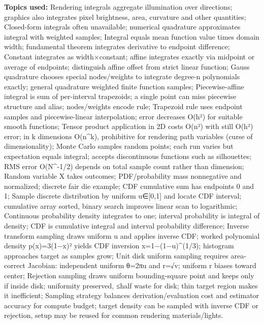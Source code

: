 \textbf{Topics used:} Rendering integrals aggregate illumination over directions; graphics also integrates pixel brightness, area, curvature and other quantities; Closed-form integrals often unavailable; numerical quadrature approximates integral with weighted samples; Integral equals mean function value times domain width; fundamental theorem integrates derivative to endpoint difference; Constant integrates as width×constant; affine integrates exactly via midpoint or average of endpoints; distinguish affine offset from strict linear function; Gauss quadrature chooses special nodes/weights to integrate degree-n polynomials exactly; general quadrature weighted finite function samples; Piecewise-affine integral is sum of per-interval trapezoids; a single point can miss piecewise structure and alias; nodes/weights encode rule; Trapezoid rule uses endpoint samples and piecewise-linear interpolation; error decreases O(h²) for suitable smooth functions; Tensor product application in 2D costs O(n²) with still O(h²) error; in k dimensions O(n\^{}k), prohibitive for rendering path variables (curse of dimensionality); Monte Carlo samples random points; each run varies but expectation equals integral; accepts discontinuous functions such as silhouettes; RMS error O(N\^{}-1/2) depends on total sample count rather than dimension; Random variable X takes outcomes; PDF/probability mass nonnegative and normalized; discrete fair die example; CDF cumulative sum has endpoints 0 and 1; Sample discrete distribution by uniform u∈{[}0,1{]} and locate CDF interval; cumulative array sorted, binary search improves linear scan to logarithmic; Continuous probability density integrates to one; interval probability is integral of density; CDF is cumulative integral and interval probability difference; Inverse transform sampling draws uniform u and applies inverse CDF; worked polynomial density p(x)=3(1−x)² yields CDF inversion x=1−(1−u)\^{}(1/3); histogram approaches target as samples grow; Unit disk uniform sampling requires area-correct Jacobian: independent uniform θ=2πu and r=√v; uniform r biases toward center; Rejection sampling draws uniform bounding-square point and keeps only if inside disk; uniformity preserved, ≤half waste for disk; thin target region makes it inefficient; Sampling strategy balances derivation/evaluation cost and estimator accuracy for compute budget; target density can be sampled with inverse CDF or rejection, setup may be reused for common rendering materials/lights.

